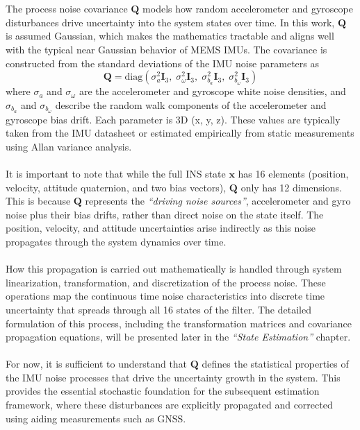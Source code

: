 \\ \\
The process noise covariance $\mathbf{Q}$ models how random accelerometer and gyroscope disturbances drive uncertainty into the system states over time. In this work, $\mathbf{Q}$ is assumed Gaussian, which makes the mathematics tractable and aligns well with the typical near Gaussian behavior of MEMS IMUs. The covariance is constructed from the standard deviations of the IMU noise parameters as  
\begin{equation}
    \mathbf{Q} =
    \mathrm{diag}(
        \sigma_a^2\mathbf{I}_3,\;
        \sigma_\omega^2\mathbf{I}_3,\;
        \sigma_{b_a}^2\mathbf{I}_3,\;
        \sigma_{b_\omega}^2\mathbf{I}_3
    )
    \label{eq:process-noise-covariance}
\end{equation}
where  
$\sigma_a$ and $\sigma_\omega$ are the accelerometer and gyroscope white noise densities, and $\sigma_{b_a}$ and $\sigma_{b_\omega}$ describe the random walk components of the accelerometer and gyroscope bias drift. Each parameter is 3D (x, y, z). These values are typically taken from the IMU datasheet or estimated empirically from static measurements using Allan variance analysis.  
\\ \\
It is important to note that while the full INS state $\mathbf{x}$ has 16 elements (position, velocity, attitude quaternion, and two bias vectors), $\mathbf{Q}$ only has 12 dimensions. This is because $\mathbf{Q}$ represents the \textit{``driving noise sources''}, accelerometer and gyro noise plus their bias drifts, rather than direct noise on the state itself. The position, velocity, and attitude uncertainties arise indirectly as this noise propagates through the system dynamics over time.  
\\ \\
How this propagation is carried out mathematically is handled through system linearization, transformation, and discretization of the process noise. These operations map the continuous time noise characteristics into discrete time uncertainty that spreads through all 16 states of the filter. The detailed formulation of this process, including the transformation matrices and covariance propagation equations, will be presented later in the \textit{``State Estimation''} chapter.  
\\ \\
For now, it is sufficient to understand that $\mathbf{Q}$ defines the statistical properties of the IMU noise processes that drive the uncertainty growth in the system. This provides the essential stochastic foundation for the subsequent estimation framework, where these disturbances are explicitly propagated and corrected using aiding measurements such as GNSS.
